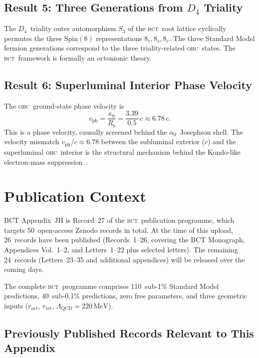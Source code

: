 \documentclass[aps,prl,twocolumn,superscriptaddress,floatfix]{revtex4-2}
\newcommand{\roct}{r_{\mathrm{oct}}}
\newcommand{\rtet}{r_{\mathrm{tet}}}
\newcommand{\az}{\alpha_0}
\newcommand{\LQCD}{\Lambda_{\mathrm{QCD}}}
\newcommand{\BCT}{\textsc{bct}}
\newcommand{\OHC}{\textsc{ohc}}
\newcommand{\kz}{\kappa_0}
\newcommand{\vph}{v_{\mathrm{ph}}}
\newcommand{\Rsph}{R_{\mathrm{s}}}
\begin{document}
\subsection{Result 5: Three Generations from $D_4$ Triality}

The $D_4$~triality outer automorphism $S_3$ of the \BCT\ root lattice
cyclically permutes the three $\mathrm{Spin}(8)$ representations
$8_v, 8_s, 8_c$.
The three Standard Model fermion generations correspond to the three
triality-related \OHC\ states.
The \BCT\ framework is formally an octonionic theory.

\subsection{Result 6: Superluminal Interior Phase Velocity}

The \OHC\ ground-state phase velocity is
\begin{equation}
  \vph = \frac{\kz}{\Rsph} = \frac{3.39}{0.5}\,c \approx 6.78\,c.
  \label{eq:vph}
\end{equation}
This is a phase velocity, causally screened behind the $\az$~Josephson
shell.
The velocity mismatch $\vph/c\approx 6.78$ between the
subluminal exterior ($c$) and the superluminal \OHC\ interior is
the structural mechanism behind the Kondo-like electron-mass
suppression~\cite{Letter19,Letter34}.

\section{Publication Context}
\label{sec:context}

BCT Appendix~JH is Record~27 of the \BCT\ publication programme,
which targets 50~open-access Zenodo records in total.
At the time of this upload, 26~records have been published
(Records~1--26, covering the BCT Monograph, Appendices Vol.~1--2,
and Letters~1--22 plus selected letters).
The remaining 24~records (Letters~23--35 and additional appendices)
will be released over the coming days.

The complete \BCT\ programme comprises 110~sub-1\% Standard Model
predictions, 40~sub-0.1\% predictions, zero free parameters, and three
geometric inputs ($\roct$, $\rtet$, $\LQCD=220\,\mathrm{MeV}$).

\subsection*{Previously Published Records Relevant to This Appendix}
\end{document}
